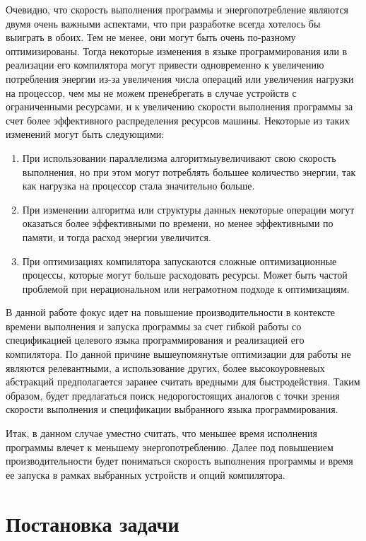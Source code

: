 \documentclass{mipt-thesis-bs}
\begin{document}
Очевидно, что скорость выполнения программы и энергопотребление являются двумя очень важными
аспектами, что при разработке всегда хотелось бы выиграть в обоих. Тем не менее, они могут
быть очень по-разному оптимизированы. Тогда некоторые изменения в языке программирования или
в реализации его компилятора могут привести одновременно к увеличению потребления энергии из-за
увеличения числа операций или увеличения нагрузки на процессор, чем мы
не можем пренебрегать в случае устройств с ограниченными ресурсами, и к увеличению скорости выполнения
программы за счет более эффективного распределения ресурсов машины. Некоторые из таких
изменений могут быть следующими:

\begin{enumerate}
    \item При использовании параллелизма алгоритмыувеличивают свою скорость выполнения, но при этом
    могут потреблять большее количество энергии, так как нагрузка на процессор стала
    значительно больше.
    \item При изменении алгоритма или структуры данных некоторые операции могут оказаться
    более эффективными по времени, но менее эффективными по памяти, и тогда расход
    энергии увеличится.
    \item При оптимизациях компилятора запускаются сложные оптимизационные процессы, которые
    могут больше расходовать ресурсы. Может быть частой проблемой при нерациональном или
    неграмотном подходе к оптимизациям.
\end{enumerate}

В данной работе фокус идет на повышение производительности в контексте времени выполнения и
запуска программы за счет гибкой работы со спецификацией целевого языка программирования и
реализацией его компилятора. По данной причине вышеупомянутые оптимизации для работы не являются
релевантными, а использование других, более высокоуровневых абстракций предполагается заранее считать
вредными для быстродействия. Таким образом, будет предлагаться поиск недорогостоящих аналогов
с точки зрения скорости выполнения и спецификации выбранного языка программирования.

Итак, в данном случае уместно считать, что меньшее время исполнения программы
влечет к меньшему энергопотреблению. Далее под повышением производительности будет пониматься скорость выполнения
программы и время ее запуска в рамках выбранных устройств и опций компилятора.



\chapter{Постановка задачи}
\end{document}
